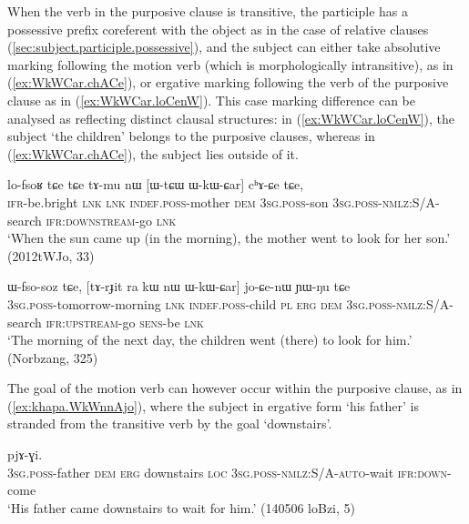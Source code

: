 When the verb in the purposive clause is transitive, the participle has a possessive prefix coreferent with the object as in the case of relative clauses (\ref{sec:subject.participle.possessive}), and the subject can either take absolutive marking following the motion verb (which is morphologically intransitive), as in (\ref{ex:WkWCar.chACe}), or ergative  marking following the verb of the purposive clause as in (\ref{ex:WkWCar.loCenW}). This case marking difference can be analysed as reflecting distinct clausal structures: in (\ref{ex:WkWCar.loCenW}), the subject  `the children' belongs to the purposive clauses, whereas in (\ref{ex:WkWCar.chACe}), the subject  lies outside of it.

\begin{exe}
\ex \label{ex:WkWCar.chACe}
 \gll lo-fsoʁ tɕe tɕe tɤ-mu nɯ [ɯ-tɕɯ ɯ-kɯ-ɕar] cʰɤ-ɕe tɕe,\\
 \textsc{ifr}-be.bright \textsc{lnk} \textsc{lnk} \textsc{indef}.\textsc{poss}-mother \textsc{dem} \textsc{3sg}.\textsc{poss}-son \textsc{3sg}.\textsc{poss}-\textsc{nmlz}:S/A-search \textsc{ifr}:\textsc{downstream}-go \textsc{lnk} \\
\glt `When the sun came up (in the morning), the mother went to look for her son.' (2012tWJo, 33)
\end{exe}

\begin{exe}
\ex \label{ex:WkWCar.loCenW}
 \gll ɯ-fso-soz tɕe, [tɤ-rɟit ra kɯ nɯ ɯ-kɯ-ɕar] jo-ɕe-nɯ ɲɯ-ŋu tɕe \\
 \textsc{3sg}.\textsc{poss}-tomorrow-morning \textsc{lnk} \textsc{indef}.\textsc{poss}-child \textsc{pl} \textsc{erg} \textsc{dem} \textsc{3sg}.\textsc{poss}-\textsc{nmlz}:S/A-search \textsc{ifr}:\textsc{upstream}-go \textsc{sens}-be \textsc{lnk} \\
\glt  `The morning of the next day, the children went (there) to look for him.'  (Norbzang, 325)
\end{exe}

The goal of the motion verb can however occur within the purposive clause, as in (\ref{ex:khapa.WkWnnAjo}), where the subject in ergative form  `his father' is stranded from the transitive verb  by the goal  `downstairs'.

\begin{exe}
\ex \label{ex:khapa.WkWnnAjo}
  pjɤ-ɣi.  \\
  \textsc{3sg}.\textsc{poss}-father \textsc{dem} \textsc{erg} downstairs \textsc{loc}    \textsc{3sg}.\textsc{poss}-\textsc{nmlz}:S/A-\textsc{auto}-wait \textsc{ifr}:\textsc{down}-come \\
  \glt `His father came downstairs to wait for him.' (140506 loBzi, 5)
\end{exe}

